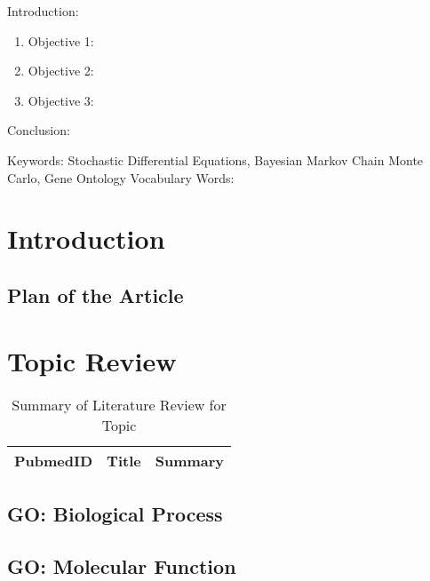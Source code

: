 

\twocolumn
\scriptsize
\begin{frontmatter}
		\title{}
		\author{}
		\address{The Mathematical Learning Space}
\end{frontmatter}	

Introduction:
\begin{enumerate}
\item Objective 1:
\item Objective 2:
\item Objective 3:
\end{enumerate}
Conclusion:

Keywords: Stochastic Differential Equations, Bayesian Markov Chain Monte Carlo, Gene Ontology
Vocabulary Words:

\section{Introduction}

\subsection{Plan of the Article}


\section{Topic Review}

\begin{table}[H]
\centering
\begin{tabular}{r|p{12cm}|l}
\hline
PubmedID  & Title & Summary \\
\hline	
\hline
	\end{tabular}
	\caption{Summary of Literature Review for Topic}
\end{table}		

\subsection{GO: Biological Process}

\subsection{GO: Molecular Function}


